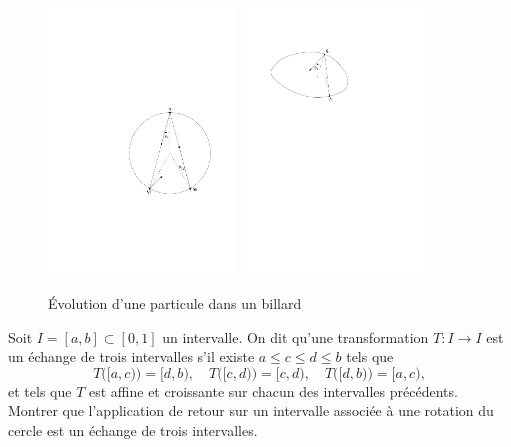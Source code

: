 \documentclass[a4paper,10pt,openany]{article}
\theoremstyle{plain}
\theoremstyle{definition}
\begin{document}
\begin{figure}[h!]
\begin{center}
\includegraphics[width=5cm]{billard.pdf}
\hspace{2cm}
\includegraphics[width=5cm]{billard2.pdf}
\end{center}
\caption{\'Evolution d'une particule dans un billard}
\label{fig:1}
\end{figure}

 \vspace{1.5mm} 

\noindent Soit $I = [a,b] \subset [0,1]$ un intervalle. On dit qu'une transformation $T : I \to I$ est un \'echange de trois intervalles s'il existe $a\leq c \leq d \leq b$ tels que
$$T\bigl([a,c)\bigr) = [d,b), \quad T\bigl([c,d)\bigr) = [c,d), \quad T\bigl([d,b)\bigr) = [a,c),$$
et tels que $T$ est affine et croissante sur chacun des intervalles pr\'ec\'edents. Montrer que l'application de retour sur un intervalle associ\'ee \`a une rotation du cercle est un \'echange de trois intervalles.
\end{document}
